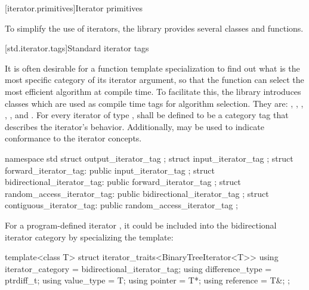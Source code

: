 [iterator.primitives]{Iterator primitives}

\pnum
To simplify the use of iterators, the library provides
several classes and functions.

[std.iterator.tags]{Standard iterator tags}

\pnum
{}%
%
%
%
%
%
It is often desirable for a
function template specialization
to find out what is the most specific category of its iterator
argument, so that the function can select the most efficient algorithm at compile time.
To facilitate this, the
library introduces
classes which are used as compile time tags for algorithm selection.
They are:
,
,
,
,
,
and
.
For every iterator of type
,
shall be defined to be a category tag that describes the
iterator's behavior.
Additionally,
may be used to indicate conformance to
the iterator concepts.

\begin{codeblock}
namespace std {
  struct output_iterator_tag { };
  struct input_iterator_tag { };
  struct forward_iterator_tag: public input_iterator_tag { };
  struct bidirectional_iterator_tag: public forward_iterator_tag { };
  struct random_access_iterator_tag: public bidirectional_iterator_tag { };
  struct contiguous_iterator_tag: public random_access_iterator_tag { };
}
\end{codeblock}

\pnum
\begin{example}
For a program-defined iterator
,
it could be included
into the bidirectional iterator category by specializing the
template:

\begin{codeblock}
template<class T> struct iterator_traits<BinaryTreeIterator<T>> {
  using iterator_category = bidirectional_iterator_tag;
  using difference_type   = ptrdiff_t;
  using value_type        = T;
  using pointer           = T*;
  using reference         = T&;
};
\end{codeblock}
\end{example}

